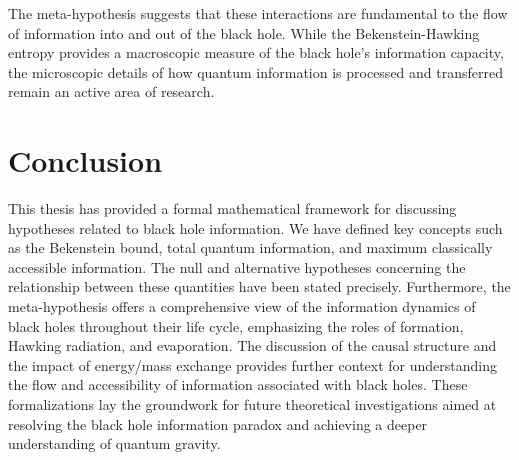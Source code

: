 	The meta-hypothesis suggests that these interactions are fundamental to the flow of information into and out of the black hole. While the Bekenstein-Hawking entropy provides a macroscopic measure of the black hole's information capacity, the microscopic details of how quantum information is processed and transferred remain an active area of research.
	
	\section{Conclusion}
	
	This thesis has provided a formal mathematical framework for discussing hypotheses related to black hole information. We have defined key concepts such as the Bekenstein bound, total quantum information, and maximum classically accessible information. The null and alternative hypotheses concerning the relationship between these quantities have been stated precisely. Furthermore, the meta-hypothesis offers a comprehensive view of the information dynamics of black holes throughout their life cycle, emphasizing the roles of formation, Hawking radiation, and evaporation. The discussion of the causal structure and the impact of energy/mass exchange provides further context for understanding the flow and accessibility of information associated with black holes. These formalizations lay the groundwork for future theoretical investigations aimed at resolving the black hole information paradox and achieving a deeper understanding of quantum gravity.
	
